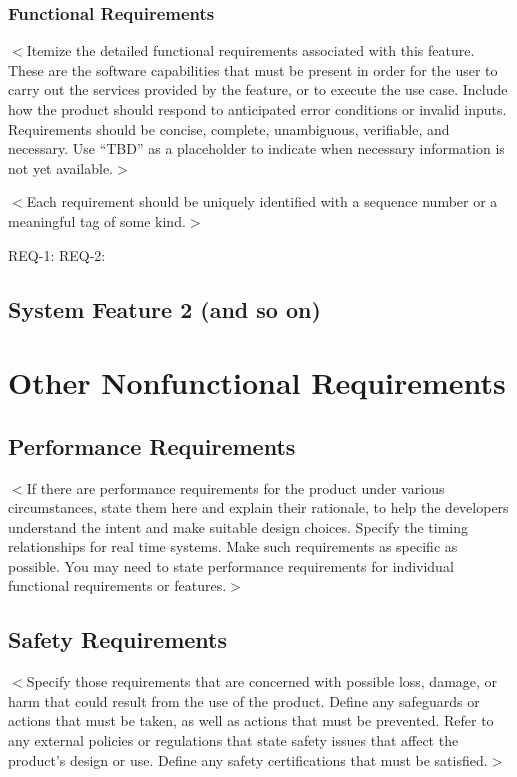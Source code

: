 \documentclass{scrreprt}
\begin{document}
\begin{CJK}{UTF8}{bkai}
\subsection{Functional Requirements}
$<$Itemize the detailed functional requirements associated with this feature.  
These are the software capabilities that must be present in order for the user 
to carry out the services provided by the feature, or to execute the use case.  
Include how the product should respond to anticipated error conditions or 
invalid inputs. Requirements should be concise, complete, unambiguous, 
verifiable, and necessary. Use “TBD” as a placeholder to indicate when necessary 
information is not yet available.$>$

$<$Each requirement should be uniquely identified with a sequence number or a 
meaningful tag of some kind.$>$

REQ-1:	REQ-2:

\section{System Feature 2 (and so on)}


\chapter{Other Nonfunctional Requirements}

\section{Performance Requirements}
$<$If there are performance requirements for the product under various 
circumstances, state them here and explain their rationale, to help the 
developers understand the intent and make suitable design choices. Specify the 
timing relationships for real time systems. Make such requirements as specific 
as possible. You may need to state performance requirements for individual 
functional requirements or features.$>$

\section{Safety Requirements}
$<$Specify those requirements that are concerned with possible loss, damage, or 
harm that could result from the use of the product. Define any safeguards or 
actions that must be taken, as well as actions that must be prevented. Refer to 
any external policies or regulations that state safety issues that affect the 
product’s design or use. Define any safety certifications that must be 
satisfied.$>$


\end{CJK}
\end{document}
